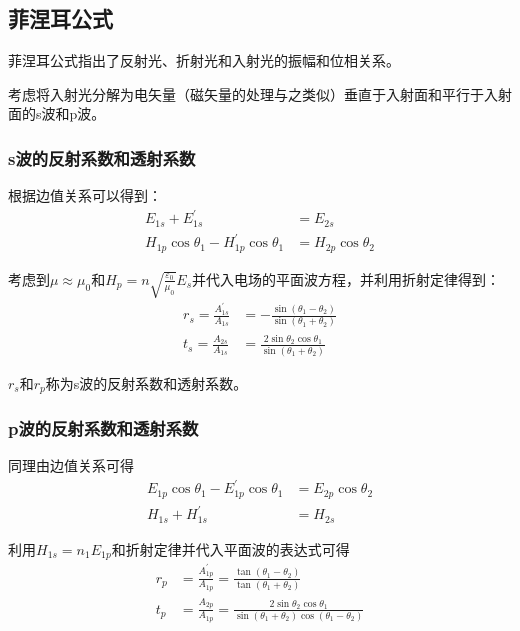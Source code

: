 \documentclass[UTF8]{ctexart}
\begin{document}
	\subsection{菲涅耳公式}
	菲涅耳公式指出了反射光、折射光和入射光的振幅和位相关系。
	
	考虑将入射光分解为电矢量（磁矢量的处理与之类似）垂直于入射面和平行于入射面的s波和p波。
	
	\subsubsection{s波的反射系数和透射系数}
	根据边值关系可以得到：
	\begin{equation}
	\begin{aligned}
	E_{1s}+E_{1s}^{\prime} &= E_{2s}
	\\
	H_{1p}\cos \theta_{1} - H_{1p}^{\prime} \cos \theta_{1} &= H_{2p} \cos \theta_{2}
	\end{aligned}
	\end{equation}
	
\noindent 考虑到$ \mu \approx \mu_{0} $和$ H_{p} = n \sqrt{\frac{\varepsilon_{0}}{\mu_{0}}} E_{s} $并代入电场的平面波方程，并利用折射定律得到：
\begin{equation}
	\begin{aligned}
	r_{s} = \frac{A_{1s}^{\prime}}{A_{1s}} &= - \frac{\sin \left(\theta_{1}-\theta_{2}\right)}{\sin \left(\theta_{1}+\theta_{2}\right)}
	\\
	t_{s} = \frac{A_{2s}}{A_{1s}} &= \frac{2 \sin \theta_{2} \cos \theta_{1}}{\sin \left(\theta_{1} + \theta_{2}\right)}
	\end{aligned}
\end{equation}

\noindent $ r_{s} $和$ r_{p} $称为s波的反射系数和透射系数。

	\subsubsection{p波的反射系数和透射系数}
	同理由边值关系可得
	\begin{equation}
	\begin{aligned}
	E_{1p} \cos \theta_{1} - E_{1p}^{\prime} \cos \theta_{1} &= E_{2p} \cos \theta_{2}
	\\
	H_{1s} + H_{1s}^{\prime} &= H_{2s}
	\end{aligned}
	\end{equation}
	
\noindent 利用$ H_{1s} = n_{1} E_{1p} $和折射定律并代入平面波的表达式可得
\begin{equation}
	\begin{aligned}
	r_{p} &= \frac{A_{1p}^{\prime}}{A_{1p}} = \frac{\tan \left(\theta_{1} - \theta_{2}\right)}{\tan \left(\theta_{1} + \theta_{2}\right)}
	\\
	t_{p} &= \frac{A_{2p}}{A_{1p}} = \frac{2 \sin \theta_{2} \cos \theta_{1}}{\sin \left(\theta_{1} + \theta_{2}\right) \cos \left(\theta_{1} - \theta_{2}\right)}
	\end{aligned}
\end{equation}
\end{document}
